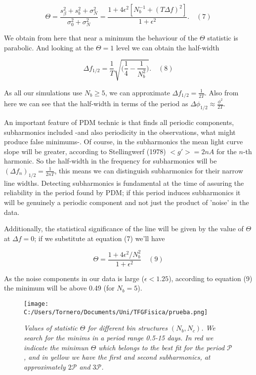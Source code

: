\documentclass[twocolumn]{revtex4}
\begin{document}
$$
\Theta = \frac{s_{\beta}^2 + s_b^2 + \sigma_N^2}{\sigma_0^2 + \sigma_N^2} = \frac{1 + 4 \epsilon^2[N_b^{-1} + (T\Delta f)^2]}{1 + \epsilon^2}. \quad (7)
$$

We obtain from here that near a minimum the behaviour of the $\Theta$ statistic is parabolic. And looking at the $\Theta = 1$ level we can obtain the half-width 

$$
\Delta f_{1/2} = \frac{1}{T}\sqrt{\big(\frac{1}{4} - \frac{1}{N_b^2}\big)}. \quad (8)
$$

As all our simulations use $N_b \geq 5$, we can approximate $\Delta f_{1/2} = \frac{1}{2T}$. Also from here we can see that the half-width in terms of the period as $\Delta\phi_{1/2} \approx \frac{\phi^2}{2T}$. 

An important feature of PDM technic is that finds all periodic components, subharmonics included -and also periodicity in the observations, what might produce false minimums-. Of course, in the subharmonics the mean light curve slope will be greater, according to Stellingwerf (1978) $<g'> = 2 n A$ for the $n$-th harmonic. So the half-width in the frequency for subharmonics will be $(\Delta f_n)_{1/2} = \frac{1}{2nT}$, this means we can distinguish subharmonics for their narrow line widths. Detecting subharmonics is fundamental at the time of assuring the reliability in the period found by PDM; if this period induces subharmonics it will be genuinely a periodic component and not just the product of 'noise' in the data.

Additionally, the statistical  significance of the line will be given by the value of $\Theta$ at $\Delta f = 0$; if we substitute at equation (7) we'll have 

$$
\Theta = \frac{1 + 4\epsilon^2/N_b^2}{1+\epsilon^2} \quad (9)
$$

As the noise components in our data is large ($\epsilon < 1.25$), according to equation (9) the minimum will be above 0.49 (for $N_b = 5$). 

\begin{figure}[ht]
\centering
\texttt{[image: C:/Users/Tornero/Documents/Uni/TFGFisica/prueba.png]}
\caption{\textit{Values of statistic $\Theta$ for different bin structures $(N_b, N_c)$. We search for the minims in a period range 0.5-15 days. In red we indicate the minimun $\Theta$ which belongs to the best fit for the period $\mathcal{P}$, and in yellow we have the first and second subharmonics, at approximately $2\mathcal{P}$ and $3\mathcal{P}$.}}
\label{fig:sample}
\end{figure}
\end{document}
